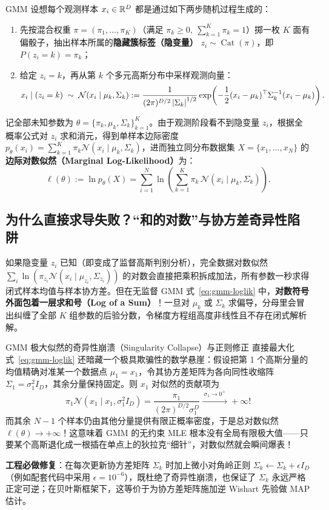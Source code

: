 GMM 设想每个观测样本 $x_i \in \mathbb{R}^D$ 都是通过如下两步随机过程生成的：
\begin{enumerate}
  \item 先按混合权重 $\pi = (\pi_1, \dots, \pi_K)$（满足 $\pi_k \ge 0,\ \sum_{k=1}^K \pi_k = 1$）掷一枚 $K$ 面有偏骰子，抽出样本所属的\textbf{隐藏簇标签（隐变量）} $z_i \sim \operatorname{Cat}(\pi)$，即 $P(z_i = k) = \pi_k$；
  \item 给定 $z_i = k$，再从第 $k$ 个多元高斯分布中采样观测向量：
  \[
    x_i \mid (z_i = k) \;\sim\; \mathcal{N}(x_i \mid \mu_k, \Sigma_k)
    := \frac{1}{(2\pi)^{D/2} \left|\Sigma_k\right|^{1/2}} \exp\!\left(-\frac{1}{2}(x_i - \mu_k)^\top \Sigma_k^{-1}(x_i - \mu_k)\right).
  \]
\end{enumerate}
记全部未知参数为 $\theta = \{\pi_k, \mu_k, \Sigma_k\}_{k=1}^K$。由于观测阶段看不到隐变量 $z_i$，根据全概率公式对 $z_i$ 求和消元，得到单样本边际密度 $p_\theta(x_i) = \sum_{k=1}^K \pi_k \mathcal{N}(x_i \mid \mu_k, \Sigma_k)$，进而独立同分布数据集 $X = \{x_1, \dots, x_N\}$ 的\textbf{边际对数似然（Marginal Log-Likelihood）}为：
\begin{equation}\label{eq:gmm-loglik}
  \ell(\theta) := \ln p_\theta(X) = \sum_{i=1}^{N} \ln\!\left(\sum_{k=1}^{K} \pi_k\,\mathcal{N}(x_i \mid \mu_k, \Sigma_k)\right).
\end{equation}

\subsection{为什么直接求导失败？“和的对数”与协方差奇异性陷阱}

如果隐变量 $z_i$ 已知（即变成了监督高斯判别分析），完全数据对数似然 $\sum_i \ln(\pi_{z_i} \mathcal{N}(x_i \mid \mu_{z_i}, \Sigma_{z_i}))$ 的对数会直接把乘积拆成加法，所有参数一秒求得闭式样本均值与样本协方差。但在无监督 GMM 式~\eqref{eq:gmm-loglik} 中，\textbf{对数符号外面包着一层求和号（Log of a Sum）}！一旦对 $\mu_k$ 或 $\Sigma_k$ 求偏导，分母里会冒出纠缠了全部 $K$ 组参数的后验分数，令梯度方程组高度非线性且不存在闭式解析解。

\begin{failBox}{GMM 极大似然的奇异性崩溃（Singularity Collapse）与正则修正}
直接最大化式~\eqref{eq:gmm-loglik} 还暗藏一个极具欺骗性的数学悬崖：假设把第 1 个高斯分量的均值精确对准某一个数据点 $\mu_1 = x_1$，令其协方差矩阵为各向同性收缩阵 $\Sigma_1 = \sigma_1^2 I_D$，其余分量保持固定。则 $x_1$ 对似然的贡献项为
\[
  \pi_1 \mathcal{N}(x_1 \mid x_1, \sigma_1^2 I_D) = \frac{\pi_1}{(2\pi)^{D/2} \sigma_1^D} \xrightarrow{\;\sigma_1 \to 0^+\;} +\infty!
\]
而其余 $N-1$ 个样本仍由其他分量提供有限正概率密度，于是总对数似然 $\ell(\theta) \to +\infty$！这意味着 GMM 的无约束 MLE 根本没有全局有限极大值——只要某个高斯退化成一根插在单点上的狄拉克“细针”，对数似然就会瞬间爆表！

\textbf{工程必做修复}：在每次更新协方差矩阵 $\Sigma_k$ 时加上微小对角岭正则 $\Sigma_k \leftarrow \Sigma_k + \epsilon I_D$（例如配套代码中采用 $\epsilon = 10^{-6}$），既杜绝了奇异性崩溃，也保证了 $\Sigma_k$ 永远严格正定可逆；在贝叶斯框架下，这等价于为协方差矩阵施加逆 Wishart 先验做 MAP 估计。
\end{failBox}

